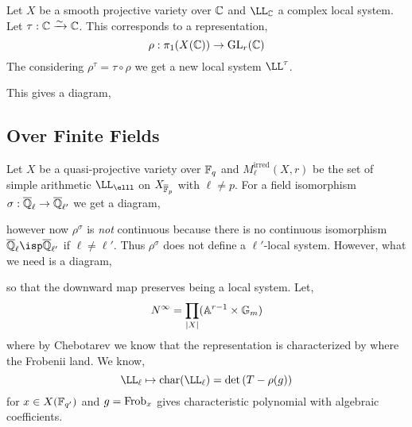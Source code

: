 \documentclass[12pt]{article}
\begin{document}
Let $X$ be a smooth projective variety over $\mathbb{C}$ and $\LL_{\CC}$ a complex local system. Let $\tau : \mathbb{C} \xrightarrow{\sim} \mathbb{C}$. This corresponds to a representation,
\[ \rho : \pi_1(X(\mathbb{C})) \to \mathrm{GL}_r(\mathbb{C}) \]
The considering $\rho^{\tau} = \tau \circ \rho$ we get a new local system $\LL^\tau$. 

This gives a diagram,
\begin{center}
\end{center}

\subsection{Over Finite Fields}

\newcommand{\irred}{\mathrm{irred}}

Let $X$ be a quasi-projective variety over $\mathbb{F}_q$ and $M^{\irred}_\ell(X,r)$ be the set of simple arithmetic $\LL_{\elll}$ on $X_{\overline{\mathbb{F}}_p}$ with $\ell \neq p$. For a field isomorphism $\sigma : \overline{\mathbb{Q}}_{\ell} \to \overline{\mathbb{Q}}_{\ell'}$ we get a diagram,
\begin{center}
\end{center}
however now $\rho^{\sigma}$ is \textit{not} continuous because there is no continuous isomorphism $\Qbar_{\ell} \isp \Qbar_{\ell'}$ if $\ell \neq \ell'$. Thus $\rho^{\sigma}$ does not define a $\ell'$-local system. However, what we need is a diagram,
\begin{center}
\end{center}
so that the downward map preserves being a local system. 
Let,
\[ N^\infty = \prod_{|X|} (\mathbb{A}^{r-1} \times \mathbb{G}_m) \]
where by Chebotarev we know that the representation is characterized by where the Frobenii land. We know,
\[ \LL_{\ell} \mapsto \mathrm{char}(\LL_\ell) = \det{(T - \rho(g))} \]
for $x \in X(\mathbb{F}_{q'})$ and $g = \mathrm{Frob}_x$ gives characteristic polynomial with algebraic coefficients.
\end{document}
